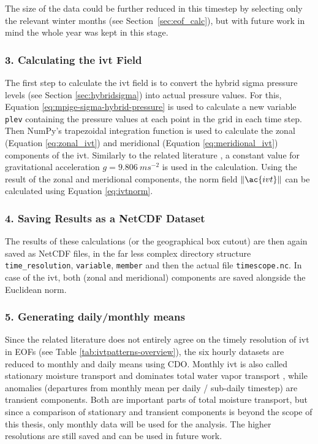 The size of the data could be further reduced in this timestep by selecting only the relevant winter months (see Section~\ref{sec:eof_calc}), but with future work in mind the whole year was kept in this stage. 

\subsubsection{3. Calculating the \ac{ivt} Field}

The first step to calculate the \ac{ivt} field is to convert the hybrid sigma pressure levels (see Section \ref{sec:hybridsigma}) into actual pressure values. 
For this, Equation \ref{eq:mpige-sigma-hybrid-pressure} is used to calculate a new variable \texttt{plev} containing the pressure values at each point in the grid in each time step. 
Then NumPy's trapezoidal integration function is used to calculate the zonal (Equation \ref{eq:zonal_ivt}) and meridional (Equation \ref{eq:meridional_ivt}) components of the \ac{ivt}. 
Similarly to the related literature \cite{ayantobo_integrated_2022}, a constant value for gravitational acceleration $g = 9.806~ms^{-2}$ is used in the calculation. 
Using the result of the zonal and meridional components, the norm field $\lVert \ac{ivt} \rVert$ can be calculated using Equation \ref{eq:ivtnorm}. 



\subsubsection{4. Saving Results as a NetCDF Dataset}

The results of these calculations (or the geographical box cutout) are then again saved as NetCDF files, in the far less complex directory structure \texttt{time\_resolution}, \texttt{variable}, \texttt{member} and then the actual file \texttt{timescope.nc}. 
In case of the \ac{ivt}, both (zonal and meridional) components are saved alongside the Euclidean norm. 


\subsubsection{5. Generating daily/monthly means}

Since the related literature does not entirely agree on the timely resolution of \ac{ivt} in EOFs (see Table \ref{tab:ivtpatterns-overview}), the six hourly datasets are reduced to monthly and daily means using CDO.
Monthly \ac{ivt} is also called stationary moisture transport and dominates total water vapor transport \cite{zhou_atmospheric_2005}, while anomalies (departures from monthly mean per daily / sub-daily timestep) are transient components.
Both are important parts of total moisture transport, but since a comparison of stationary and transient components is beyond the scope of this thesis, only monthly data will be used for the analysis. 
The higher resolutions are still saved and can be used in future work. 

